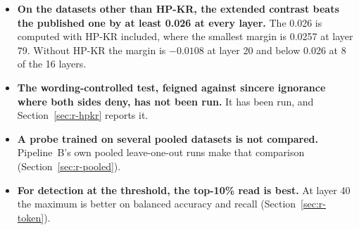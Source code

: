 \begin{itemize}
It does so at 8 of the 12 layers from 36; it trails the best contrast at layer 44 (0.8283 against 0.9077), 48 (0.8373 against 0.8903), 52 (0.8773 against 0.8834) and 76 (0.8382 against 0.9249). %
\item \textbf{On the datasets other than HP-KR, the extended contrast beats the published one by at least 0.026 at every layer.} %
The 0.026 is computed with HP-KR included, where the smallest margin is 0.0257 at layer 79. %
Without HP-KR the margin is $-0.0108$ at layer 20 and below 0.026 at 8 of the 16 layers. %
\item \textbf{The wording-controlled test, feigned against sincere ignorance where both sides deny, has not been run.} %
It has been run, and Section~\ref{sec:r-hpkr} reports it. %
\item \textbf{A probe trained on several pooled datasets is not compared.} %
Pipeline~B's own pooled leave-one-out runs make that comparison (Section~\ref{sec:r-pooled}). %
\item \textbf{For detection at the threshold, the top-10\% read is best.} %
At layer 40 the maximum is better on balanced accuracy and recall (Section~\ref{sec:r-token}). %

\end{itemize}
